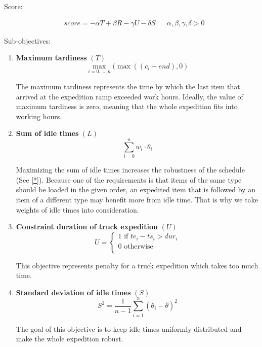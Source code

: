 \documentclass{ctuthesis}
\begin{document}
Score:

\begin{equation}
\begin{aligned}
    &score = -\alpha T + \beta R - \gamma  U - \delta S && \alpha, \beta, \gamma, \delta > 0
\end{aligned}
\end{equation}

Sub-objectives:

\begin{enumerate}
\item \textbf{Maximum tardiness} $(T)$\\ \begin{equation}\max_{i=0,\ldots,n}(\max((c_i - end), 0)\end{equation}

The maximum tardiness represents the time by which the last item that arrived at the expedition ramp exceeded work hours. Ideally, the value of maximum tardiness is zero, meaning that the whole expedition fits into working hours.

\item \textbf{Sum of idle times} $(L)$\\ 
\begin{equation}
    \sum_{i=0}^{n} w_i \cdot \theta_i
\end{equation}

Maximizing the sum of idle times increases the robustness of the schedule (See \ref{*}). Because one of the requirements is that items of the same type should be loaded in the given order, an expedited item that is followed by an item of a different type may benefit more from idle time. That is why we take weights of idle times into consideration.

\item \textbf{Constraint duration of truck expedition} $(U)$
\begin{equation} 
   U = \begin{cases}
        1 \text{ if } te_i - ts_i > dur_i\\
        \text{0 otherwise}\\
       \end{cases}
\end{equation}

This objective represents penalty for a truck expedition which takes too much time.

\item \textbf{Standard deviation of idle times} $(S)$
\begin{equation} 
    S^2=\frac{1}{n-1}\sum_{i=1}^{n} (\theta_{i} -\bar{\theta})^2 
\end{equation}

The goal of this objective is to keep idle times uniformly distributed and make the whole expedition robust.

\end{enumerate}
 
\end{document}
